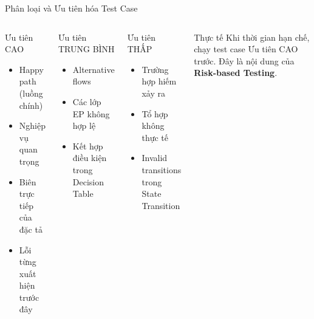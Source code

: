 \documentclass[aspectratio=169,12pt]{beamer}
\begin{document}
\begin{frame}{Phân loại và Ưu tiên hóa Test Case}
  \begin{columns}
    \begin{block}{Ưu tiên CAO}
      \begin{itemize}
        \item Happy path (luồng chính)
        \item Nghiệp vụ quan trọng
        \item Biên trực tiếp của đặc tả
        \item Lỗi từng xuất hiện trước đây
      \end{itemize}
    \end{block}

    \begin{block}{Ưu tiên TRUNG BÌNH}
      \begin{itemize}
        \item Alternative flows
        \item Các lớp EP không hợp lệ
        \item Kết hợp điều kiện trong Decision Table
      \end{itemize}
    \end{block}

    \begin{block}{Ưu tiên THẤP}
      \begin{itemize}
        \item Trường hợp hiếm xảy ra
        \item Tổ hợp không thực tế
        \item Invalid transitions trong State Transition
      \end{itemize}
    \end{block}

    \vspace{0.3em}
    \begin{exampleblock}{Thực tế}
      Khi thời gian hạn chế, chạy test case Ưu tiên CAO trước.
      Đây là nội dung của \textbf{Risk-based Testing}.
    \end{exampleblock}
  \end{columns}
\end{frame}
\end{document}
